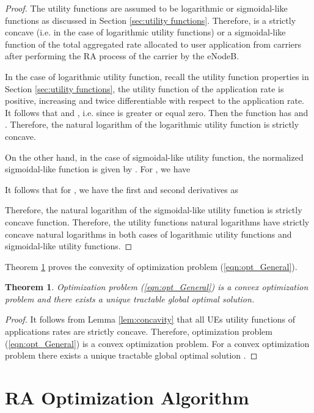 \documentclass[journal]{IEEEtran} 				\IEEEoverridecommandlockouts 						\usepackage{amsmath,amssymb}
\newtheorem{thm}{Theorem}[section]
\begin{document}
\begin{proof}
The utility functions are assumed to be logarithmic or sigmoidal-like functions as discussed in Section \ref{sec:utility functions}. Therefore,  is a strictly concave (i.e. in the case of logarithmic utility functions) or a sigmoidal-like function of the total aggregated rate  allocated to user  application from carriers  after performing the RA process of the  carrier by the eNodeB.

In the case of logarithmic utility function, recall the utility function properties in Section \ref{sec:utility functions}, the utility function of the application rate is positive, increasing and twice differentiable with respect to the application rate. It follows that  and , i.e. since  is greater or equal zero. Then the function  has  and . Therefore, the natural logarithm of the logarithmic utility function  is strictly concave.

On the other hand, in the case of sigmoidal-like utility function, the normalized sigmoidal-like function is given by . For , we have



It follows that for , we have the first and second derivatives as

Therefore, the natural logarithm of the sigmoidal-like utility function  is strictly concave function. Therefore, the utility functions natural logarithms have strictly concave natural logarithms in both cases of logarithmic utility functions and sigmoidal-like utility functions.
\end{proof}

Theorem \ref{thm:global_soln} proves the convexity of optimization problem (\ref{eqn:opt_General}).

\begin{thm}\label{thm:global_soln}
Optimization problem (\ref{eqn:opt_General}) is a convex optimization problem and there exists a unique tractable global optimal solution.
\end{thm}

\begin{proof}
It follows from Lemma \ref{lem:concavity} that all UEs utility functions of applications rates are strictly concave. Therefore, optimization problem (\ref{eqn:opt_General}) is a convex optimization problem. For a convex optimization problem there exists a unique tractable global optimal solution \cite{Boyd}.
\end{proof}

\section{RA Optimization Algorithm}\label{sec:Algorithm}
\end{document}
